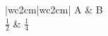 \documentclass{article}
\begin{document}
\begin{longtable}{|w{c}{2cm}|w{c}{2cm}|}
\hline
{}A & B \\
\hline
\endhead
\endfoot
$\frac12$ & $\frac14$ \\
\hline
\end{longtable}
\end{document}

